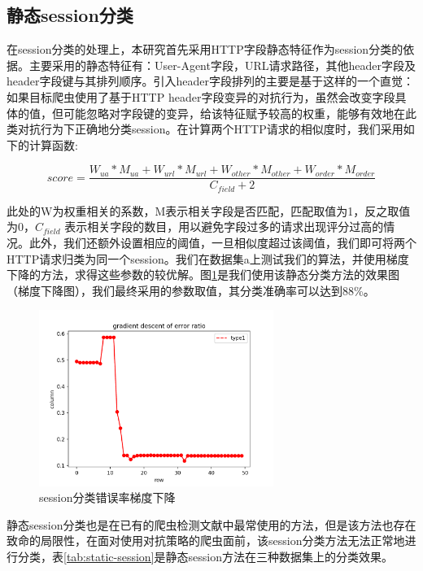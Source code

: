 \documentclass[doctor,privacy,twoside]{buaa_mac}
\begin{document}
\subsection{静态session分类}
在session分类的处理上，本研究首先采用HTTP字段静态特征作为session分类的依据。主要采用的静态特征有：User-Agent字段，URL请求路径，其他header字段及header字段键与其排列顺序。引入header字段排列的主要是基于这样的一个直觉：如果目标爬虫使用了基于HTTP header字段变异的对抗行为，虽然会改变字段具体的值，但可能忽略对字段键的变异，给该特征赋予较高的权重，能够有效地在此类对抗行为下正确地分类session。在计算两个HTTP请求的相似度时，我们采用如下的计算函数:

\begin{equation}
score = \frac {W_{ua} * M_{ua} + W_{url} * M_{url} + W_{other} * M_{other} + W_{order} * M_{order}} {C_{field} + 2}
\end{equation}


此处的W为权重相关的系数，M表示相关字段是否匹配，匹配取值为1，反之取值为0，$C_{field}$ 表示相关字段的数目，用以避免字段过多的请求出现评分过高的情况。此外，我们还额外设置相应的阈值，一旦相似度超过该阈值，我们即可将两个HTTP请求归类为同一个session。我们在数据集a上测试我们的算法，并使用梯度下降的方法，求得这些参数的较优解。图\ref{fig:gradient}是我们使用该静态分类方法的效果图（梯度下降图），我们最终采用的参数取值，其分类准确率可以达到88\%。

\centerline{}
\begin{figure}[!h]
  \centering
  \includegraphics[width=0.68\textwidth]{images/gradient_descent.png}
  \caption{session分类错误率梯度下降}
  \label{fig:gradient}
\end{figure}


静态session分类也是在已有的爬虫检测文献中最常使用的方法，但是该方法也存在致命的局限性，在面对使用对抗策略的爬虫面前，该session分类方法无法正常地进行分类，表\ref{tab:static-session}是静态session方法在三种数据集上的分类效果。
\end{document}
